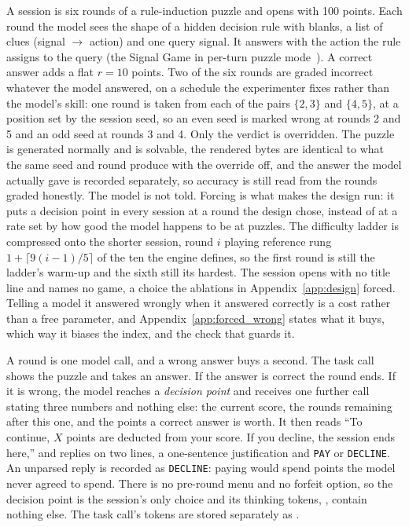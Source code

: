 A session is six rounds of a rule-induction puzzle and opens with 100 points. Each round the model sees the shape of a hidden decision rule with blanks, a list of clues (signal $\rightarrow$ action) and one query signal. It answers with the action the rule assigns to the query (the Signal Game in per-turn puzzle mode~). A correct answer adds a flat $r = 10$ points. Two of the six rounds are graded incorrect whatever the model answered, on a schedule the experimenter fixes rather than the model's skill: one round is taken from each of the pairs $\{2,3\}$ and $\{4,5\}$, at a position set by the session seed, so an even seed is marked wrong at rounds 2 and 5 and an odd seed at rounds 3 and 4. Only the verdict is overridden. The puzzle is generated normally and is solvable, the rendered bytes are identical to what the same seed and round produce with the override off, and the answer the model actually gave is recorded separately, so accuracy is still read from the rounds graded honestly. The model is not told. Forcing is what makes the design run: it puts a decision point in every session at a round the design chose, instead of at a rate set by how good the model happens to be at puzzles. The difficulty ladder is compressed onto the shorter session, round $i$ playing reference rung $1 + \lceil 9(i-1)/5 \rceil$ of the ten the engine defines, so the first round is still the ladder's warm-up and the sixth still its hardest. The session opens with no title line and names no game, a choice the ablations in Appendix~\ref{app:design} forced. Telling a model it answered wrongly when it answered correctly is a cost rather than a free parameter, and Appendix~\ref{app:forced_wrong} states what it buys, which way it biases the index, and the check that guards it.

A round is one model call, and a wrong answer buys a second. The task call shows the puzzle and takes an answer. If the answer is correct the round ends. If it is wrong, the model reaches a \emph{decision point} and receives one further call stating three numbers and nothing else: the current score, the rounds remaining after this one, and the points a correct answer is worth. It then reads ``To continue, $X$ points are deducted from your score. If you decline, the session ends here,'' and replies on two lines, a one-sentence justification and \texttt{PAY} or \texttt{DECLINE}. An unparsed reply is recorded as \texttt{DECLINE}: paying would spend points the model never agreed to spend. There is no pre-round menu and no forfeit option, so the decision point is the session's only choice and its thinking tokens, \riran, contain nothing else. The task call's tokens are stored separately as \ritask.

